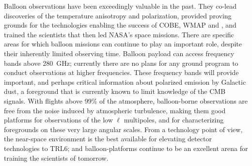 \documentclass[PICOReport.tex]{subfiles}
\begin{document}

Balloon observations have been exceedingly valuable in the past. They co-lead discoveries of the temperature anisotropy and polarization, provided proving grounds for the technologies enabling the success of COBE, WMAP and \planck , and trained the scientists that then led NASA's space missions. There are specific areas for which balloon missions can continue to play an important role, despite their inherently limited observing time. Balloon payload can access frequency bands above 280~GHz; currently there are no plans for any ground program to conduct observations at higher frequencies. These frequency bands will provide important, and perhaps critical information about polarized emission by  Galactic dust, a foreground that is currently known to limit knowledge of the CMB signals.  With flights above 99\% of the atmosphere, balloon-borne observations are free from the noise induced by atmospheric turbulence, making them good platforms for observations of the low $\ell$ multipoles, and for characterizing foregrounds on these very large angular scales. From a technology point of view, the near-space environment is the best available for elevating detector technologies to TRL6; and balloon-platforms continue to be an excellent arena for training the scientists of tomorrow. 

\end{document}
